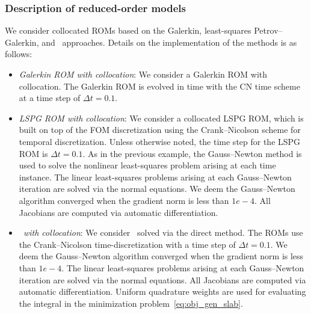 \subsubsection{Description of reduced-order models}
We consider collocated ROMs based on the Galerkin, least-squares Petrov--Galerkin, and \methodAcronym\ approaches. Details on the implementation of the methods is as follows:
\begin{itemize}
\item \textit{Galerkin ROM with collocation}: We consider a Galerkin ROM with collocation. 
The Galerkin ROM is evolved in time with the CN time scheme at a time step of $\Delta t =0.1$.

\item \textit{LSPG ROM with collocation}: We consider a collocated LSPG ROM, which is built on top of the FOM discretization using the Crank--Nicolson scheme for temporal 
discretization. Unless otherwise noted, the time step for the LSPG ROM is $\Delta t  = 0.1$. As in the previous example, 
the Gauss--Newton method is used to solve the nonlinear least-squares problem arising at each time instance. The linear least-squares problems 
arising at each Gauss--Newton iteration are solved via the normal equations. We deem the Gauss--Newton 
algorithm converged when the gradient norm is less than $1e-4$. All Jacobians are computed via automatic differentiation.
 
\item \textit{\methodAcronymROMs\ with collocation}: We consider \methodAcronymROMs\ solved via the direct method. The ROMs use the Crank--Nicolson time-discretization with a time step of 
$\Delta t = 0.1$. We deem the Gauss--Newton algorithm converged when the gradient norm is less than $1e-4$. The linear least-squares problems
arising at each Gauss--Newton iteration are solved via the normal equations. All Jacobians are computed via automatic differentiation. Uniform quadrature 
weights are used for evaluating the integral in the minimization problem~\eqref{eq:obj_gen_slab}. 
 
\end{itemize}


